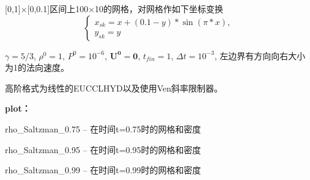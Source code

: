 \documentclass{article}
\begin{document}
[0,1]×[0,0.1]区间上100×10的网格，对网格作如下坐标变换
\begin{equation}
\left\{\begin{array}{l}
x_{sk}=x+(0.1-y)*\sin(\pi*x),\\
y_{sk}=y
\end{array}\right.
\end{equation}


$\gamma=5/3$, $\rho^0=1$, $P^0=10^{-6}$, $\mathbf{U^0}=\mathbf{0}$, $t_{fin}=1$, $\Delta t=10^{-3}$, 左边界有方向向右大小为1的法向速度。

高阶格式为线性的EUCCLHYD以及使用Ven斜率限制器。

\textbf{plot：}

rho\_Saltzman\_0.75 -- 在时间t=0.75时的网格和密度

rho\_Saltzman\_0.95 -- 在时间t=0.95时的网格和密度

rho\_Saltzman\_0.99 -- 在时间t=0.99时的网格和密度
\end{document}
